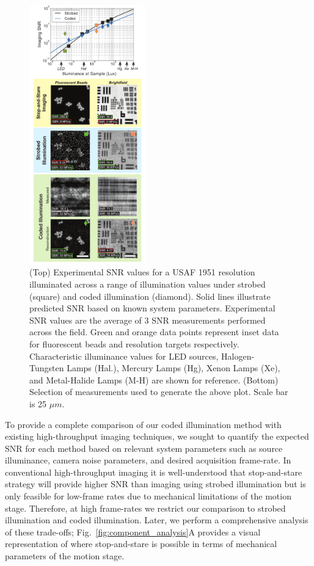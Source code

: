 \begin{figure}
\centering
\includegraphics[width=0.45\textwidth]{figures/fig_highthroughput_snr_comparison.pdf}
  \caption{\label{fig:experimental_comparison}(Top) Experimental SNR values for a USAF 1951 resolution illuminated across a range of illumination values under strobed (square) and coded illumination (diamond). Solid lines illustrate predicted SNR based on known system parameters. Experimental SNR values are the average of 3 SNR measurements performed across the field. Green and orange data points represent inset data for fluorescent beads and resolution targets respectively. Characteristic illuminance values for LED sources, Halogen-Tungsten Lamps (Hal.), Mercury Lamps (Hg), Xenon Lamps (Xe), and Metal-Halide Lamps (M-H) are shown for reference. (Bottom) Selection of measurements used to generate the above plot. Scale bar is 25 $\mu m$.}

\end{figure}

To provide a complete comparison of our coded illumination method with existing high-throughput imaging techniques, we sought to quantify the expected SNR for each method based on relevant system parameters such as source illuminance, camera noise parameters, and desired acquisition frame-rate. In conventional high-throughput imaging it is well-understood that stop-and-stare strategy will provide higher SNR than imaging using strobed illumination but is only feasible for low-frame rates due to mechanical limitations of the motion stage.
Therefore, at high frame-rates we restrict our comparison to strobed illumination and coded illumination. Later, we perform a comprehensive analysis of these trade-offs; Fig.~\ref{fig:component_analysis}A provides a visual representation of where stop-and-stare is possible in terms of mechanical parameters of the motion stage.

